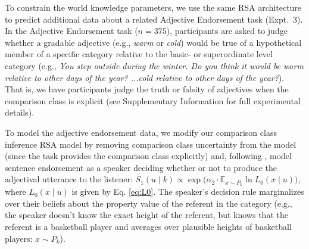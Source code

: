 \documentclass[doc]{apa6}
\begin{document}
To constrain the world knowledge parameters, we use the same RSA architecture to predict additional data about a related Adjective Endorsement task (Expt.~3). 
In the Adjective Endorsement task ($n=375$), participants are asked to judge whether a gradable adjective (e.g., \emph{warm} or \emph{cold}) would be true of a hypothetical member of a specific category relative to the basic- or superordinate level category (e.g., \emph{You step outside during the winter. Do you think it would be warm relative to other days of the year? ...cold relative to other days of the year?}). 
That is, we have participants judge the truth or falsity of adjectives when the comparison class is explicit (see Supplementary Information for full experimental details).

To model the adjective endorsement data, we modify our comparison class inference RSA model by removing comparison class uncertainty from the model (since the task provides the comparison class explicitly) and, following , model sentence endorsement as a speaker deciding whether or not to produce the adjectival utterance to the listener: $S_{1}(u \mid k) \propto \exp{(\alpha_2 \cdot {\mathbb E}_{x\sim P_{k}}} \ln{L_0(x \mid u)})$, where $L_0(x \mid u)$ is given by Eq. \ref{eq:L0}. 
The speaker's decision rule marginalizes over their beliefs about the property value of the referent in the category (e.g., the speaker doesn't know the exact height of the referent, but knows that the referent is a basketball player and averages over plausible heights of basketball players: $x\sim P_{k}$).
\end{document}
